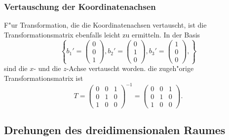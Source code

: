 \subsubsection{Vertauschung der Koordinatenachsen}
F"ur Transformation, die die Koordinatenachsen vertauscht, ist
die Transformationsmatrix ebenfalls leicht zu ermitteln.
In der Basis
\[
\left\{
b_1'=\begin{pmatrix}0\\0\\1\end{pmatrix},
b_2'=\begin{pmatrix}0\\1\\0\end{pmatrix},
b_3'=\begin{pmatrix}1\\0\\0\end{pmatrix},
\right\}
\]
sind die $x$- und die $z$-Achse vertauscht worden.
die zugeh"orige Transformationsmatrix ist
\begin{equation}
T=\begin{pmatrix}
0&0&1\\
0&1&0\\
1&0&0
\end{pmatrix}^{-1}
=
\begin{pmatrix}
0&0&1\\
0&1&0\\
1&0&0
\end{pmatrix}.
\label{transformation-vertauschung}
\end{equation}

\subsection{Drehungen des dreidimensionalen Raumes}
